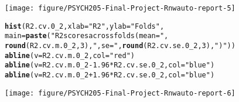 \documentclass{article}\usepackage[]{graphicx}\usepackage[]{xcolor}
\makeatletter
\newcommand{\hlnum}[1]{\textcolor[rgb]{0.686,0.059,0.569}{#1}}%
\newcommand{\hlstr}[1]{\textcolor[rgb]{0.192,0.494,0.8}{#1}}%
\newcommand{\hlopt}[1]{\textcolor[rgb]{0,0,0}{#1}}%
\newcommand{\hlstd}[1]{\textcolor[rgb]{0.345,0.345,0.345}{#1}}%
\newcommand{\hlkwc}[1]{\textcolor[rgb]{0.333,0.667,0.333}{#1}}%
\newcommand{\hlkwd}[1]{\textcolor[rgb]{0.737,0.353,0.396}{\textbf{#1}}}%
\newenvironment{kframe}{%
 \def\at@end@of@kframe{}%
 \ifinner\ifhmode%
  \def\at@end@of@kframe{\end{minipage}}%
  \begin{minipage}{\columnwidth}%
 \fi\fi%
 \def\FrameCommand##1{\hskip\@totalleftmargin \hskip-\fboxsep
 \colorbox{shadecolor}{##1}\hskip-\fboxsep
     \hskip-\linewidth \hskip-\@totalleftmargin \hskip\columnwidth}%
 \MakeFramed {\advance\hsize-\width
   \@totalleftmargin\z@ \linewidth\hsize
   \@setminipage}}%
 {\par\unskip\endMakeFramed%
 \at@end@of@kframe}
\newenvironment{knitrout}{}{} %
\makeatother
\begin{document}
\begin{knitrout}
{\centering \texttt{[image: figure/PSYCH205-Final-Project-Rnwauto-report-5]} 

}


\begin{kframe}\begin{alltt}
\hlkwd{hist}\hlstd{(R2.cv.0_2,} \hlkwc{xlab}\hlstd{=}\hlstr{"R2"}\hlstd{,} \hlkwc{ylab}\hlstd{=}\hlstr{"Folds"}\hlstd{,}
     \hlkwc{main}\hlstd{=}\hlkwd{paste}\hlstd{(}\hlstr{"R2 scores across folds (mean = "}\hlstd{,}
                \hlkwd{round}\hlstd{(R2.cv.m.0_2,} \hlnum{3}\hlstd{),} \hlstr{", se = "}\hlstd{,} \hlkwd{round}\hlstd{(R2.cv.se.0_2,} \hlnum{3}\hlstd{),} \hlstr{")"}\hlstd{))}
\hlkwd{abline}\hlstd{(}\hlkwc{v}\hlstd{=R2.cv.m.0_2,} \hlkwc{col}\hlstd{=}\hlstr{"red"}\hlstd{)}
\hlkwd{abline}\hlstd{(}\hlkwc{v}\hlstd{=R2.cv.m.0_2} \hlopt{-} \hlnum{1.96}\hlopt{*}\hlstd{R2.cv.se.0_2,} \hlkwc{col}\hlstd{=}\hlstr{"blue"}\hlstd{)}
\hlkwd{abline}\hlstd{(}\hlkwc{v}\hlstd{=R2.cv.m.0_2} \hlopt{+} \hlnum{1.96}\hlopt{*}\hlstd{R2.cv.se.0_2,} \hlkwc{col}\hlstd{=}\hlstr{"blue"}\hlstd{)}
\end{alltt}
\end{kframe}

{\centering \texttt{[image: figure/PSYCH205-Final-Project-Rnwauto-report-6]} 

}



\end{knitrout}
\end{document}

